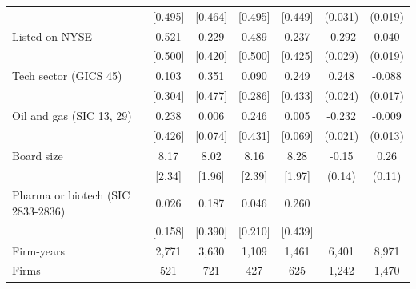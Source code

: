 \begin{tabular}{lcccccc}
 & [0.495] & [0.464] & [0.495] & [0.449] & (0.031) & (0.019) \\
Listed on NYSE & 0.521 & 0.229 & 0.489 & 0.237 & -0.292 & 0.040 \\
 & [0.500] & [0.420] & [0.500] & [0.425] & (0.029) & (0.019) \\
Tech sector (GICS 45) & 0.103 & 0.351 & 0.090 & 0.249 & 0.248 & -0.088 \\
 & [0.304] & [0.477] & [0.286] & [0.433] & (0.024) & (0.017) \\
Oil and gas (SIC 13, 29) & 0.238 & 0.006 & 0.246 & 0.005 & -0.232 & -0.009 \\
 & [0.426] & [0.074] & [0.431] & [0.069] & (0.021) & (0.013) \\
Board size & 8.17 & 8.02 & 8.16 & 8.28 & -0.15 & 0.26 \\
 & [2.34] & [1.96] & [2.39] & [1.97] & (0.14) & (0.11) \\
Pharma or biotech (SIC 2833-2836) & 0.026 & 0.187 & 0.046 & 0.260 &  &  \\
 & [0.158] & [0.390] & [0.210] & [0.439] &  &  \\
\hline
Firm-years & 2,771 & 3,630 & 1,109 & 1,461 & 6,401 & 8,971 \\
Firms & 521 & 721 & 427 & 625 & 1,242 & 1,470 \\
\hline\hline
\end{tabular}
